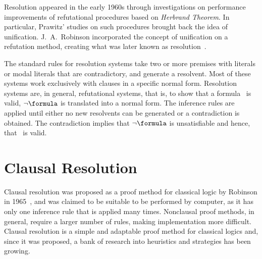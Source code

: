 Resolution appeared in the early 1960s through investigations on performance
improvements of refutational procedures based on \emph{Herbrand Theorem}. In
particular, Prawitz' studies on such procedures brought back the idea of
unification. J.~A.~Robinson incorporated the concept of unification on a
refutation method, creating what was later known as resolution~\cite{casanova}. 

The standard rules for resolution systems take two or more premises with literals or
modal literals that are contradictory, and generate a resolvent. Most of these
systems work exclusively with clauses in a specific normal form. Resolution
systems are, in general, refutational systems, that is, to show that a
formula \formula~is valid, $\neg \formula$ is translated into a normal form. The
inference rules are applied until either no new resolvents can be generated or a
contradiction is obtained. The contradiction implies that $\neg \formula$ is
unsatisfiable and hence, that \formula~is valid.


\section{Clausal Resolution}

Clausal resolution was proposed as a proof method for classical logic by
Robinson in 1965~\cite{Robinson65}, and was claimed to be suitable to be
performed by computer, as it has only one inference rule that is applied
many times. Nonclausal proof methods, in general, require a larger number of
rules, making implementation more difficult. Clausal resolution is a simple and
adaptable proof method for classical logics and, since it was proposed, a bank
of research into heuristics and strategies has been growing. 



